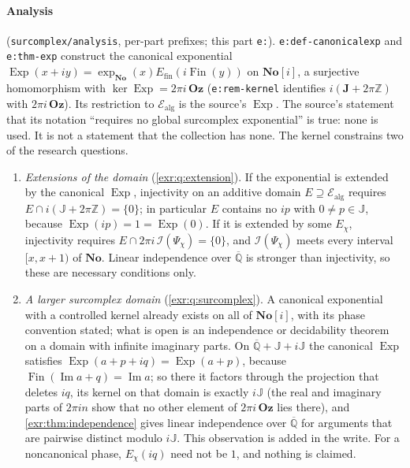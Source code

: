 \documentclass[11pt,letterpaper]{article}
\numberwithin{equation}{section}
\theoremstyle{definition}
\theoremstyle{remark}
\newcommand{\No}{\mathbf{No}}
\newcommand{\Oz}{\mathbf{Oz}}
\newcommand{\SC}{\mathbf{No}[i]}
\newcommand{\Z}{\mathbb Z}
\newcommand{\Qb}{\overline{\mathbb Q}}
\newcommand{\J}{\mathbb J}
\newcommand{\Ealg}{\mathcal E_{\mathrm{alg}}}
\newcommand{\Exp}{\operatorname{Exp}}
\newcommand{\rpath}[1]{\nolinkurl{#1}}%
\newcommand{\lbl}[1]{\nolinkurl{#1}}%
\begin{document}
\paragraph{Analysis}
(\rpath{surcomplex/analysis}, per-part prefixes; this part \texttt{e:}).
\lbl{e:def-canonicalexp} and \lbl{e:thm-exp} construct the canonical
exponential $\Exp(x+iy)=\exp_{\No}(x)E_{\mathrm{fin}}(i\operatorname{Fin}(y))$
on $\SC$, a surjective homomorphism with $\ker\Exp=2\pi i\,\Oz$
(\lbl{e:rem-kernel} identifies $i(\mathbf J+2\pi\Z)$ with $2\pi i\,\Oz$). Its
restriction to $\Ealg$ is the source's $\Exp$. The source's statement that its
notation ``requires no global surcomplex exponential'' is true: none is used.
It is not a statement that the collection has none. The kernel constrains two
of the research questions.
\begin{enumerate}[leftmargin=*,itemsep=3pt]
\item \emph{Extensions of the domain} (\cref{exr:q:extension}). If the
exponential is extended by the canonical $\Exp$, injectivity on an additive
domain $E\supseteq\Ealg$ requires $E\cap i(\J+2\pi\Z)=\{0\}$; in particular
$E$ contains no $ip$ with $0\ne p\in\J$, because $\Exp(ip)=1=\Exp(0)$. If it
is extended by some $E_\chi$, injectivity requires
$E\cap2\pi i\,\mathcal I(\Psi_\chi)=\{0\}$, and $\mathcal I(\Psi_\chi)$ meets every interval
$[x,x+1)$ of $\No$. Linear independence over $\Qb$ is stronger than
injectivity, so these are necessary conditions only.
\item \emph{A larger surcomplex domain} (\cref{exr:q:surcomplex}). A
canonical exponential with a controlled kernel already exists on all of
$\SC$, with its phase convention stated; what is open is an independence or
decidability theorem on a domain with infinite imaginary parts. On
$\Qb+\J+i\J$ the canonical $\Exp$ satisfies $\Exp(a+p+iq)=\Exp(a+p)$, because
$\operatorname{Fin}(\operatorname{Im}a+q)=\operatorname{Im}a$; so there it
factors through the projection that deletes $iq$, its kernel on that domain
is exactly $i\J$ (the real and imaginary parts of $2\pi i n$ show that no
other element of $2\pi i\,\Oz$ lies there), and \cref{exr:thm:independence}
gives linear independence over $\Qb$ for arguments that are pairwise distinct
modulo $i\J$. This observation is added in the write. For a noncanonical
phase, $E_\chi(iq)$ need not be $1$, and nothing is claimed.
\end{enumerate}
\end{document}
